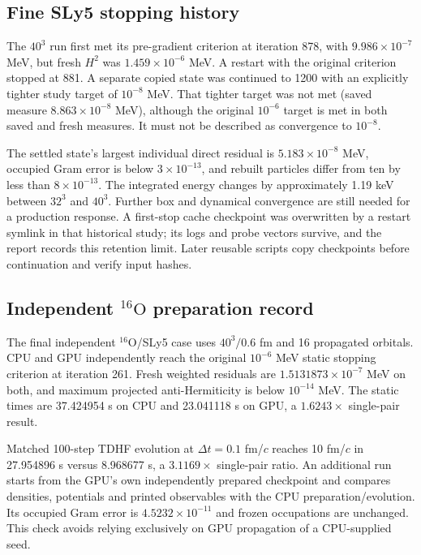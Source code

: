 \documentclass[11pt,a4paper]{article}
\newcommand{\Ox}{\texorpdfstring{\ensuremath{^{16}\mathrm{O}}}{16O}}
\begin{document}
\subsection{Fine SLy5 stopping history}
The $40^3$ run first met its pre-gradient criterion at iteration 878,
with $9.986\times10^{-7}$ MeV, but fresh $H^2$ was
$1.459\times10^{-6}$ MeV. A restart with the original criterion stopped
at 881. A separate copied state was continued to 1200 with an explicitly
tighter study target of $10^{-8}$ MeV. That tighter target was not met
(saved measure $8.863\times10^{-8}$ MeV), although the original $10^{-6}$
target is met in both saved and fresh measures. It must not be described
as convergence to $10^{-8}$.

The settled state's largest individual direct residual is
$5.183\times10^{-8}$ MeV, occupied Gram error is below $3\times10^{-13}$,
and rebuilt particles differ from ten by less than $8\times10^{-13}$.
The integrated energy changes by approximately 1.19 keV between $32^3$
and $40^3$. Further box and dynamical convergence are still needed for
a production response. A first-stop cache checkpoint was overwritten by
a restart symlink in that historical study; its logs and probe vectors
survive, and the report records this retention limit. Later reusable
scripts copy checkpoints before continuation and verify input hashes.

\subsection{Independent \Ox{} preparation record}
The final independent \Ox{}/SLy5 case uses $40^3/0.6$ fm and 16 propagated
orbitals. CPU and GPU independently reach the original $10^{-6}$ MeV
static stopping criterion at iteration 261. Fresh weighted residuals are
$1.5131873\times10^{-7}$ MeV on both, and maximum projected
anti-Hermiticity is below $10^{-14}$ MeV. The static times are 37.424954 s
on CPU and 23.041118 s on GPU, a $1.6243\times$ single-pair result.

Matched 100-step TDHF evolution at $\Delta t=0.1$ fm/$c$ reaches 10 fm/$c$
in 27.954896 s versus 8.968677 s, a $3.1169\times$ single-pair ratio.
An additional run starts from the GPU's own independently prepared
checkpoint and compares densities, potentials and printed observables
with the CPU preparation/evolution. Its occupied Gram error is
$4.5232\times10^{-11}$ and frozen occupations are unchanged. This check
avoids relying exclusively on GPU propagation of a CPU-supplied seed.
\end{document}
